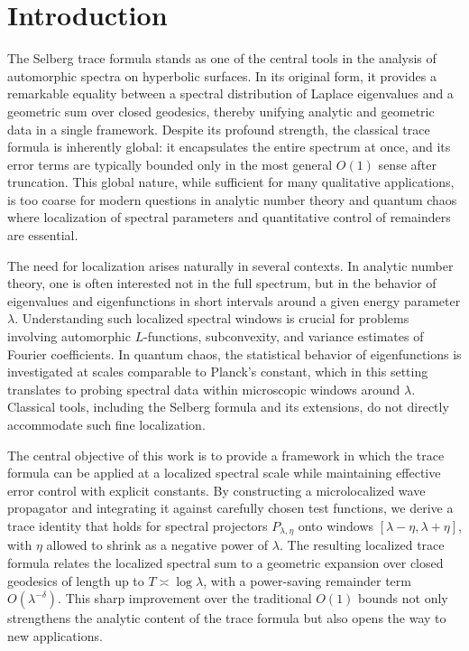 \section{Introduction}

The Selberg trace formula stands as one of the central tools in the analysis of
automorphic spectra on hyperbolic surfaces. In its original form, it provides a
remarkable equality between a spectral distribution of Laplace eigenvalues and
a geometric sum over closed geodesics, thereby unifying analytic and geometric
data in a single framework. Despite its profound strength, the classical trace
formula is inherently global: it encapsulates the entire spectrum at once, and
its error terms are typically bounded only in the most general $O(1)$ sense
after truncation. This global nature, while sufficient for many qualitative
applications, is too coarse for modern questions in analytic number theory and
quantum chaos where localization of spectral parameters and quantitative
control of remainders are essential.

The need for localization arises naturally in several contexts. In analytic
number theory, one is often interested not in the full spectrum, but in the
behavior of eigenvalues and eigenfunctions in short intervals around a given
energy parameter $\lambda$. Understanding such localized spectral windows is
crucial for problems involving automorphic $L$-functions, subconvexity, and
variance estimates of Fourier coefficients. In quantum chaos, the statistical
behavior of eigenfunctions is investigated at scales comparable to Planck’s
constant, which in this setting translates to probing spectral data within
microscopic windows around $\lambda$. Classical tools, including the Selberg
formula and its extensions, do not directly accommodate such fine localization.

The central objective of this work is to provide a framework in which the trace
formula can be applied at a localized spectral scale while maintaining effective
error control with explicit constants. By constructing a microlocalized wave
propagator and integrating it against carefully chosen test functions, we
derive a trace identity that holds for spectral projectors $P_{\lambda,\eta}$
onto windows $[\lambda-\eta,\lambda+\eta]$, with $\eta$ allowed to shrink as a
negative power of $\lambda$. The resulting localized trace formula relates the
localized spectral sum to a geometric expansion over closed geodesics of length
up to $T \asymp \log \lambda$, with a power-saving remainder term
$O(\lambda^{-\delta})$. This sharp improvement over the traditional $O(1)$
bounds not only strengthens the analytic content of the trace formula but also
opens the way to new applications.

